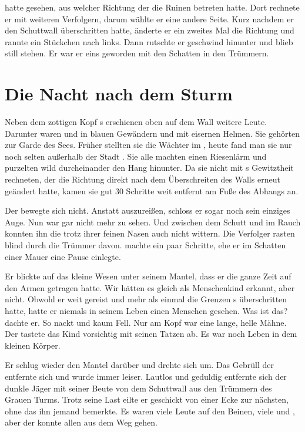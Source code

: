 \begin{huge}
{\Eno} hatte gesehen, aus welcher Richtung der {\Bangiri} die Ruinen betreten hatte. Dort rechnete er mit weiteren Verfolgern, darum wählte er eine andere Seite. Kurz nachdem er den Schuttwall überschritten hatte, änderte er ein zweites Mal die Richtung und rannte ein Stückchen nach links. Dann rutschte er geschwind hinunter und blieb still stehen. Er war er eins geworden mit den Schatten in den Trümmern.

\section{Die Nacht nach dem Sturm}
Neben dem zottigen Kopf {\Pato}s erschienen oben auf dem Wall weitere Leute. Darunter waren {\Bangiri} und {\Enlander} in blauen Gewändern und mit eisernen Helmen. Sie gehörten zur Garde des Sees. Früher stellten sie die Wächter im {\Enland}, heute fand man sie nur noch selten außerhalb der Stadt {\Tern}. Sie alle machten einen Riesenlärm und purzelten wild durcheinander den Hang hinunter. Da sie nicht mit {\Eno}s Gewitztheit rechneten, der die Richtung direkt nach dem Überschreiten des Walls erneut geändert hatte, kamen sie gut 30 Schritte weit entfernt am Fuße des Abhangs an.

Der {\Schattenlaufer} bewegte sich nicht. Anstatt auszureißen, schloss er sogar noch sein einziges Auge. Nun war gar nicht mehr zu sehen. Und zwischen dem Schutt und im Rauch konnten ihn die {\Bangiri} trotz ihrer feinen Nasen auch nicht wittern. Die Verfolger rasten blind durch die Trümmer davon. {\Eno} machte ein paar Schritte, ehe er im Schatten einer Mauer eine Pause einlegte. 

Er blickte auf das kleine Wesen unter seinem Mantel, dass er die ganze Zeit auf den Armen getragen hatte. Wir hätten es gleich als Menschenkind erkannt, aber {\Eno} nicht. Obwohl er weit gereist und mehr als einmal die Grenzen {\Rhingell}s überschritten hatte, hatte er niemals in seinem Leben einen Menschen gesehen. Was ist das? dachte er. So nackt und kaum Fell. Nur am Kopf war eine lange, helle Mähne. Der {\Schattenlaufer} tastete das Kind vorsichtig mit seinen Tatzen ab. Es war noch Leben in dem kleinen Körper. 

Er schlug wieder den Mantel darüber und drehte sich um. Das Gebrüll der {\Bangiri} entfernte sich und wurde immer leiser. Lautlos und geduldig entfernte sich der dunkle Jäger mit seiner Beute von dem Schuttwall aus den Trümmern des Grauen Turms. Trotz seine Last eilte er geschickt von einer Ecke zur nächsten, ohne das ihn jemand bemerkte. Es waren viele Leute auf den Beinen, viele {\Enlander} und {\Bangiri}, aber der {\Schattenlaufer} konnte allen aus dem Weg gehen.


\end{huge}

